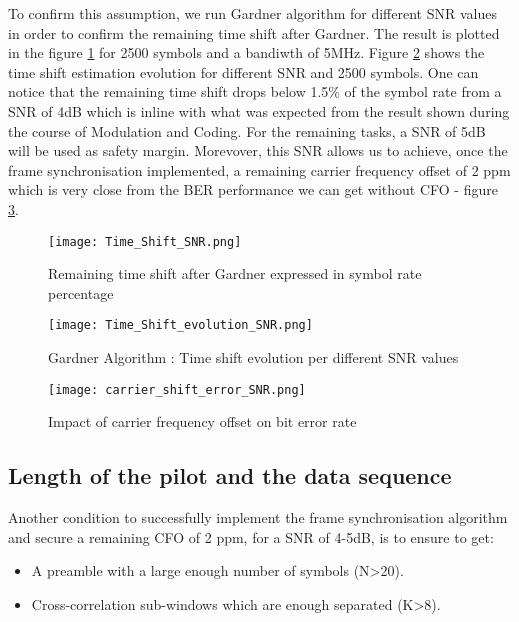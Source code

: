 To confirm this assumption, we run Gardner algorithm for different SNR values in order to confirm the remaining time shift after
Gardner.  The result is plotted in the figure \ref{Time_Shift_SNR} for 2500 symbols and a bandiwth of 5MHz.
Figure \ref{Time_Shift_evolution_SNR} shows the time shift estimation evolution for different SNR and 2500 symbols. 
 One can notice that the remaining time shift drops below 1.5\% of the symbol rate from a SNR of 4dB which is inline with what 
 was expected from the result shown during the course of Modulation and Coding.  For the remaining tasks, a SNR of 5dB will be 
 used as safety margin.
Morevover, this SNR allows us to achieve, once the frame synchronisation implemented, a remaining carrier frequency offset
of 2 ppm which is very close from the BER performance we can get without CFO - figure \ref{fig:carrier_shift_error_SNR}.

\begin{figure}[H]
    \centering
    \texttt{[image: Time\_Shift\_SNR.png]}
    \caption{Remaining time shift after Gardner expressed in symbol rate percentage}
    \label{Time_Shift_SNR}
\end{figure}

\begin{figure}[H]
    \centering
    \texttt{[image: Time\_Shift\_evolution\_SNR.png]}
    \caption{Gardner Algorithm : Time shift evolution per different SNR values}
    \label{Time_Shift_evolution_SNR}
\end{figure}


\begin{figure}[H]
    \centering
    \texttt{[image: carrier\_shift\_error\_SNR.png]}
    \caption{Impact of carrier frequency offset on bit error rate}
    \label{fig:carrier_shift_error_SNR}
\end{figure}

\subsection{Length of the pilot and the data sequence}

Another condition to successfully implement the frame synchronisation algorithm and secure a remaining 
CFO of 2 ppm, for a SNR of 4-5dB, is to ensure to get:
\begin{itemize}
    \item A preamble with a large enough number of symbols (N>20).
    \item Cross-correlation sub-windows which are enough separated (K>8).  
\end{itemize}

